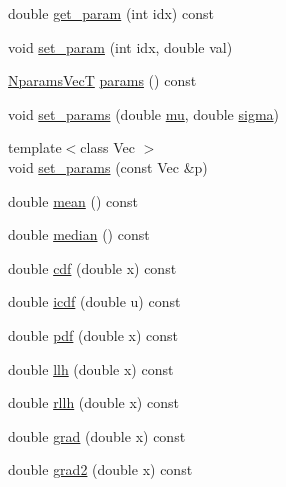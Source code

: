 \begin{DoxyCompactItemize}
\item 
double \hyperlink{classprior__hessian_1_1NormalDist_a83016bf93c57e8acba0d749c2f7a0bac}{get\+\_\+param} (int idx) const 
\item 
void \hyperlink{classprior__hessian_1_1NormalDist_a91ba326ab256fdbf6491e8caedf33f48}{set\+\_\+param} (int idx, double val)
\item 
\hyperlink{classprior__hessian_1_1NormalDist_a3a82189e42c48ff21ad49d85c7d9cf5d}{Nparams\+VecT} \hyperlink{classprior__hessian_1_1NormalDist_aaea8964b1f62318c047e3c75ac104436}{params} () const 
\item 
void \hyperlink{classprior__hessian_1_1NormalDist_a352979a2485cd990786ae53db6d64123}{set\+\_\+params} (double \hyperlink{classprior__hessian_1_1NormalDist_a33b6cc4357406f8d0dd017fc1088e1bc}{mu}, double \hyperlink{classprior__hessian_1_1NormalDist_adfc5ab11dc02672d9ef08eda487f97a7}{sigma})
\item 
{\footnotesize template$<$class Vec $>$ }\\void \hyperlink{classprior__hessian_1_1NormalDist_ac0039773c163a8b2b3540996cccb4d5f}{set\+\_\+params} (const Vec \&p)
\item 
double \hyperlink{classprior__hessian_1_1NormalDist_a461705e4f29f8f968c4dd21d217fa797}{mean} () const 
\item 
double \hyperlink{classprior__hessian_1_1NormalDist_a01e959b4aea2b94bc05fc42c9abeed3c}{median} () const 
\item 
double \hyperlink{classprior__hessian_1_1NormalDist_a821fd9870aabac911bfc7d024a82ee4e}{cdf} (double x) const 
\item 
double \hyperlink{classprior__hessian_1_1NormalDist_ab9b17827daed20f82cb7bc0e40fe62e4}{icdf} (double u) const 
\item 
double \hyperlink{classprior__hessian_1_1NormalDist_aaa9f65a188d99f432558ae6545e9c060}{pdf} (double x) const 
\item 
double \hyperlink{classprior__hessian_1_1NormalDist_a7776d18fd17739446c2848a9452b81f7}{llh} (double x) const 
\item 
double \hyperlink{classprior__hessian_1_1NormalDist_ab03d24df91ee8865e77ee8322151099f}{rllh} (double x) const 
\item 
double \hyperlink{classprior__hessian_1_1NormalDist_a5ea017ef0f5cd34304248c399b4136f3}{grad} (double x) const 
\item 
double \hyperlink{classprior__hessian_1_1NormalDist_ab346dd5512cd0ff79d3a8b9e63618126}{grad2} (double x) const 
\item 

\end{DoxyCompactItemize}
